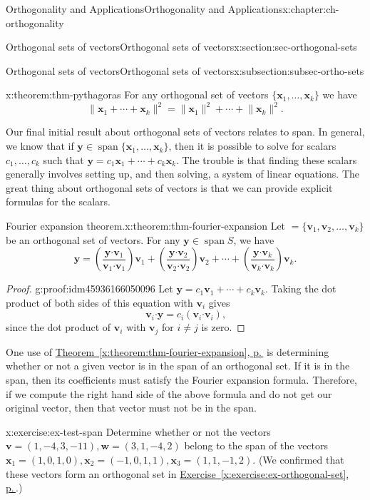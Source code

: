 \documentclass[oneside,10pt,]{book}
\newcommand{\xreffont}{\relax}
\numberwithin{equation}{section}
\newcommand{\spn}{\operatorname{span}}
\newcommand{\dotp}{\!\boldsymbol{\cdot}\!}
\newcommand{\len}[1]{\lVert #1\rVert}
\newcommand{\vv}{\mathbf{v}}
\newcommand{\ww}{\mathbf{w}}
\newcommand{\xx}{\mathbf{x}}
\newcommand{\yy}{\mathbf{y}}
\begin{document}
\begin{chapterptx}{Orthogonality and Applications}{}{Orthogonality and Applications}{}{}{x:chapter:ch-orthogonality}
\begin{sectionptx}{Orthogonal sets of vectors}{}{Orthogonal sets of vectors}{}{}{x:section:sec-orthogonal-sets}
\begin{subsectionptx}{Orthogonal sets of vectors}{}{Orthogonal sets of vectors}{}{}{x:subsection:subsec-ortho-sets}
\begin{theorem}{}{}{x:theorem:thm-pythagoras}%
For any orthogonal set of vectors \(\{\xx_1,\ldots, \xx_k\}\) we have%
\begin{equation*}
\len{\xx_1+\cdots +\xx_k}^2 = \len{\xx_1}^2+\cdots + \len{\xx_k}^2\text{.}
\end{equation*}
%
\end{theorem}
Our final initial result about orthogonal sets of vectors relates to span. In general, we know that if \(\yy\in\spn\{\xx_1,\ldots, \xx_k\}\), then it is possible to solve for scalars \(c_1,\ldots, c_k\) such that \(\yy=c_1\xx_1+\cdots+ c_k\xx_k\). The trouble is that finding these scalars generally involves setting up, and then solving, a system of linear equations. The great thing about orthogonal sets of vectors is that we can provide explicit formulas for the scalars.%
\begin{theorem}{Fourier expansion theorem.}{}{x:theorem:thm-fourier-expansion}%
Let \(=\{\vv_1,\vv_2,\ldots, \vv_k\}\) be an orthogonal set of vectors. For any \(\yy\in \spn S\), we have%
\begin{equation*}
\yy = \left(\frac{\yy\dotp\mathbf{v}_1}{\vv_1\dotp\vv_1}\right)\vv_1+
\left(\frac{\yy\dotp\mathbf{v}_2}{\vv_2\dotp\vv_2}\right)\vv_2+\cdots +
\left(\frac{\yy\dotp\mathbf{v}_k}{\vv_k\dotp\vv_k}\right)\vv_k\text{.}
\end{equation*}
%
\end{theorem}
\begin{proof}{}{g:proof:idm45936166050096}
Let \(\yy=c_1\vv_1+\cdots + c_k\vv_k\). Taking the dot product of both sides of this equation with \(\vv_i\) gives%
\begin{equation*}
\vv_i\dotp\yy = c_i(\vv_i\dotp\vv_i)\text{,}
\end{equation*}
since the dot product of \(\vv_i\) with \(\vv_j\) for \(i\neq j\) is zero.%
\end{proof}
One use of \hyperref[x:theorem:thm-fourier-expansion]{Theorem~{\xreffont\ref{x:theorem:thm-fourier-expansion}}, p.\,\pageref{x:theorem:thm-fourier-expansion}} is determining whether or not a given vector is in the span of an orthogonal set. If it is in the span, then its coefficients must satisfy the Fourier expansion formula. Therefore, if we compute the right hand side of the above formula and do not get our original vector, then that vector must not be in the span.%
\begin{inlineexercise}{}{x:exercise:ex-test-span}%
Determine whether or not the vectors \(\vv=(1,-4,3,-11), \ww=(3,1,-4,2)\) belong to the span of the vectors \(\xx_1=(1,0,1,0), \xx_2=(-1,0,1,1), \xx_3=(1,1,-1,2)\). (We confirmed that these vectors form an orthogonal set in \hyperref[x:exercise:ex-orthogonal-set]{Exercise~{\xreffont\ref{x:exercise:ex-orthogonal-set}}, p.\,\pageref{x:exercise:ex-orthogonal-set}}.)%

\end{inlineexercise}
\end{subsectionptx}
\end{sectionptx}
\end{chapterptx}
\end{document}
